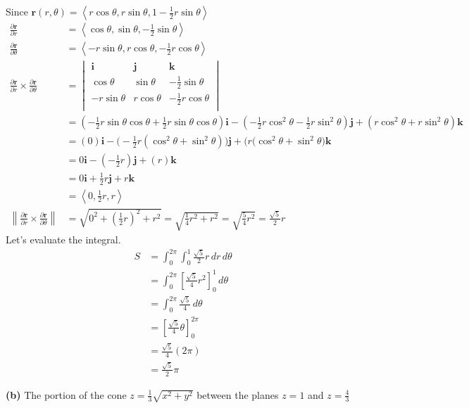 \documentclass{article}
\newcommand{\lrp}[1]{\left( #1 \right)}
\newcommand{\lra}[1]{\left\langle #1 \right\rangle}
\newcommand{\lrb}[1]{\left[ #1 \right]}
\newcommand{\norm}[1]{\left\lVert #1 \right\rVert}
\renewcommand{\i}[0]{\mathbf{i}}
\renewcommand{\j}[0]{\mathbf{j}}
\renewcommand{\k}[0]{\mathbf{k}}
\renewcommand{\r}[0]{\mathbf{r}}
\begin{document}
Since $\displaystyle\r(r,\theta)=\lra{r\cos\theta,r\sin\theta, 1-\frac{1}{2}r\sin\theta}$
\begin{align*}
    \frac{\partial \r}{\partial r}&=\lra{\cos\theta, \sin\theta, -\frac{1}{2}\sin\theta}\\
    \frac{\partial \r}{\partial \theta}&=\lra{-r\sin\theta, r\cos\theta, -\frac{1}{2}r\cos\theta}\\
    \frac{\partial \r}{\partial r}\times \frac{\partial \r}{\partial \theta}&=\begin{vmatrix}
\mathbf{i} & \mathbf{j} & \mathbf{k}\\
\cos\theta & \sin\theta & -\frac{1}{2}\sin\theta\\
-r\sin\theta & r\cos\theta & -\frac{1}{2}r\cos\theta\\
\end{vmatrix}\\
&=\lrp{-\frac{1}{2}r\sin\theta\cos\theta+\frac{1}{2}r\sin\theta\cos\theta}\i -\lrp{-\frac{1}{2}r\cos^2\theta - \frac{1}{2}r\sin^2\theta}\j + \lrp{r\cos^2\theta + r\sin^2\theta}\k\\
&=\lrp{0}\i -\Bigg(-\frac{1}{2}r\lrp{\cos^2\theta+\sin^2\theta}\Bigg)\j+\Big(r(\cos^2\theta+\sin^2\theta\Big)\k\\
&=0\i -\lrp{-\frac{1}{2}r}\j+\lrp{r}\k\tag{$\cos^2\theta+\sin^2\theta=1$}\\
&=0\i +{\frac{1}{2}r}\j+r\k\\
&=\lra{0, \frac{1}{2}r,r}\\
\norm{\frac{\partial \r}{\partial r}\times \frac{\partial \r}{\partial \theta}}&=\sqrt{0^2+\lrp{\frac{1}{2}r}^2+r^2}=\sqrt{\frac{1}{4}r^2+r^2}=\sqrt{\frac{5}{4}r^2}=\frac{\sqrt{5}}{2}r
\end{align*}
Let's evaluate the integral.
\begin{align*}
    S&=\int_0^{2\pi}\int_0^1 \frac{\sqrt{5}}{2}r\,dr\,d\theta\\
    &=\int_0^{2\pi}\lrb{\frac{\sqrt{5}}{4}r^2}_0^1\,d\theta\\
    &=\int_0^{2\pi}\frac{\sqrt{5}}{4}\,d\theta\\
    &=\lrb{\frac{\sqrt{5}}{4}\theta}_0^{2\pi}\\
    &=\frac{\sqrt{5}}{4}\lrp{2\pi}\\
    &=\boxed{\frac{\sqrt{5}}{2}\pi}
\end{align*}
{} \textbf{(b)} The portion of the cone $\displaystyle z=\frac{1}{3}\sqrt{x^2+y^2}$ between the planes $z=1$ and $z= \frac{4}{3}$
\end{document}
